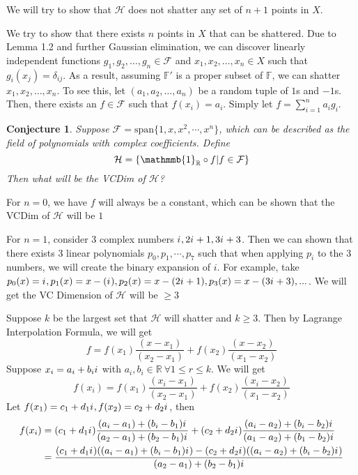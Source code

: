 \documentclass{article}
\newtheorem{conjecture}[theorem]{Conjecture}
\newcommand{\iu}{{i\mkern1mu}}
\begin{document}
We will try to show that $\mathcal{H}$ does not shatter any set of $n+1$ points in $X$.

We try to show that there exists $n$ points in $X$ that can be shattered. Due to Lemma 1.2 and further Gaussian elimination, we can discover linearly independent functions $g_1, g_2, \dots, g_n \in \mathcal{F}$ and $x_1, x_2, \dots, x_n \in X$ such that $g_i(x_j) = \delta_{ij}$. As a result, assuming $\mathbb{F}'$ is a proper subset of $\mathbb{F}$, we can shatter $x_1, x_2, \dots, x_n$. To see this, let $(a_1, a_2, \dots, a_n)$ be a random tuple of $1$s and $-1$s. Then, there exists an $f \in \mathcal{F}$ such that $f(x_i) = a_i$. Simply let $f = \sum_{i=1}^n a_ig_i$.

\begin{conjecture}
Suppose $\mathcal{F} = \text{span}\{1,x,x^2,\cdots,x^n\}$, which can be described as the field of polynomials with complex coefficients. Define
$$\mathcal{H} = \{\mathmmb{1}_{\mathbb{R}} \circ f| f \in \mathcal{F} \}$$
Then what will be the VCDim of $\mathcal{H}$?
\end{conjecture}

For $n=0$, we have $f$ will always be a constant, which can be shown that the VCDim of $\mathcal{H}$ will be $1$

For $n=1$, consider 3 complex numbers $\iu,2\iu+1,3\iu+3$. Then we can shown that there exists 3 linear polynomials $p_0,p_1,\cdots,p_7$ such that when applying $p_i$ to the 3 numbers, we will create the binary expansion of $i$. For example, take $p_0(x) = \iu, p_1(x) = x-(\iu), p_2(x)=x-(2\iu+1), p_3(x) = x-(3\iu+3),...$. We will get the VC Dimension of $\mathcal{H}$ will be $\geq 3$

Suppose $k$ be the largest set that $\mathcal{H}$ will shatter and $k \geq 3$. Then by Lagrange Interpolation Formula, we will get
$$f = f(x_1) \frac{(x-x_1)}{(x_2-x_1)}+f(x_2) \frac{(x-x_2)}{(x_1-x_2)}$$
Suppose $x_i = a_i+b_i \iu$ with $a_i,b_i \in \mathbb{R} \ \forall 1 \leq r \leq k$. We will get
$$f(x_i) = f(x_1) \frac{(x_i-x_1)}{(x_2-x_1)}+f(x_2)\frac{(x_i-x_2)}{(x_1-x_2)}$$
Let $f(x_1) = c_1+d_1 \iu, f(x_2) = c_2+d_2\iu$, then
\begin{align*}
    f(x_i) &= (c_1+d_1\iu) \frac{(a_i-a_1)+(b_i-b_1)\iu}{(a_2-a_1)+(b_2-b_1)\iu}+(c_2+d_2\iu)\frac{(a_i-a_2)+(b_i-b_2)\iu}{(a_1-a_2)+(b_1-b_2)\iu}\\
    &= \frac{(c_1+d_1\iu)((a_i-a_1)+(b_i-b_1)\iu)-(c_2+d_2\iu)((a_i-a_2)+(b_i-b_2)\iu)}{(a_2-a_1)+(b_2-b_1)\iu}
\end{align*}
\end{document}
